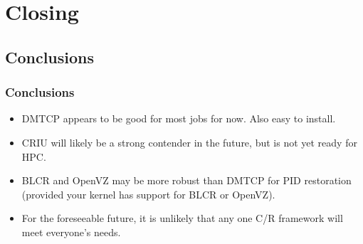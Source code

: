 \documentclass[compress]{beamer}
\begin{document}




\section{Closing}           %


\subsection{Conclusions}
\begin{frame}
\frametitle{Conclusions}

\begin{itemize}
\item DMTCP appears to be good for most jobs for now. Also easy to install.
\item CRIU will likely be a strong contender in the future, but is not
yet ready for HPC.
\item BLCR and OpenVZ may be more robust than DMTCP for PID restoration (provided
your kernel has support for BLCR or OpenVZ).
\item For the foreseeable future, it is unlikely that any one C/R framework
will meet everyone's needs.


\end{itemize}

\end{frame}

\end{document}
